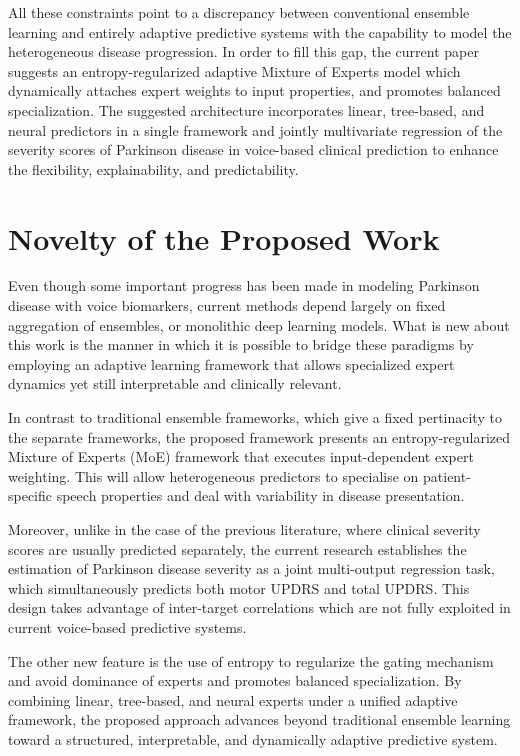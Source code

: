 \documentclass{customIEEEsingle}
\begin{document}
	All these constraints point to a discrepancy between conventional ensemble learning and entirely adaptive predictive systems with the capability to model the heterogeneous disease progression. In order to fill this gap, the current paper suggests an entropy-regularized adaptive Mixture of Experts model which dynamically attaches expert weights to input properties, and promotes balanced specialization. The suggested architecture incorporates linear, tree-based, and neural predictors in a single framework and jointly multivariate regression of the severity scores of Parkinson disease in voice-based clinical prediction to enhance the flexibility, explainability, and predictability.
	
	\section{Novelty of the Proposed Work} \label{sec:novelty}
	
	Even though some important progress has been made in modeling Parkinson disease with voice biomarkers, current methods depend largely on fixed aggregation of ensembles, or monolithic deep learning models. What is new about this work is the manner in which it is possible to bridge these paradigms by employing an adaptive learning framework that allows specialized expert dynamics yet still interpretable and clinically relevant.
	
	In contrast to traditional ensemble frameworks, which give a fixed pertinacity to the separate frameworks, the proposed framework presents an entropy-regularized Mixture of Experts (MoE) framework that executes input-dependent expert weighting. This will allow heterogeneous predictors to specialise on patient-specific speech properties and deal with variability in disease presentation.
	
	Moreover, unlike in the case of the previous literature, where clinical severity scores are usually predicted separately, the current research establishes the estimation of Parkinson disease severity as a joint multi-output regression task, which simultaneously predicts both motor UPDRS and total UPDRS. This design takes advantage of inter-target correlations which are not fully exploited in current voice-based predictive systems.
	
	The other new feature is the use of entropy to regularize the gating mechanism and avoid dominance of experts and promotes balanced specialization. By combining linear, tree-based, and neural experts under a unified adaptive framework, the proposed approach advances beyond traditional ensemble learning toward a structured, interpretable, and dynamically adaptive predictive system.
	
\end{document}
